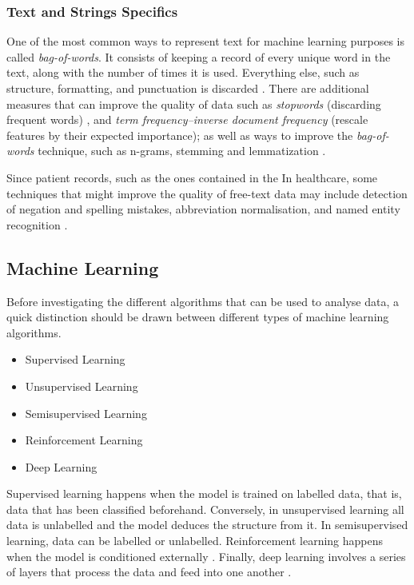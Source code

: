 \documentclass[a4paper,12pt]{article}
\begin{document}
\subsubsection{Text and Strings Specifics}

One of the most common ways to represent text for machine learning purposes is called \textit{bag-of-words}.
It consists of keeping a record of every unique word in the text, along with the number of times it is used.
Everything else, such as structure, formatting, and punctuation is discarded \parencite[327]{Mueller2017}.
There are additional measures that can improve the quality of data such as \textit{stopwords} (discarding frequent words) \parencite[327-336]{Mueller2017}, and \textit{term frequency–inverse document frequency} (rescale features by their expected importance);
as well as ways to improve the \textit{bag-of-words} technique, such as n-grams, stemming and lemmatization \parencite[339,344]{Mueller2017}.

Since patient records, such as the ones contained in the 
In healthcare, some techniques that might improve the quality of free-text data may include detection of negation and spelling mistakes, abbreviation normalisation, and named entity recognition \parencite{Dalianis2015}.

\subsection{Machine Learning}

Before investigating the different algorithms that can be used to analyse data, a quick distinction should be drawn between different types of machine learning algorithms.

\begin{itemize}
 \item Supervised Learning
 \item Unsupervised Learning
 \item Semisupervised Learning
 \item Reinforcement Learning
 \item Deep Learning
\end{itemize}

Supervised learning happens when the model is trained on labelled data, that is, data that has been classified beforehand.
Conversely, in unsupervised learning all data is unlabelled and the model deduces the structure from it. In semisupervised learning, data can be labelled or unlabelled.
Reinforcement learning happens when the model is conditioned externally \parencite[11]{Ibrahim2021}.
Finally, deep learning involves a series of layers that process the data and feed into one another \parencite[13]{Ibrahim2021}.
\end{document}
